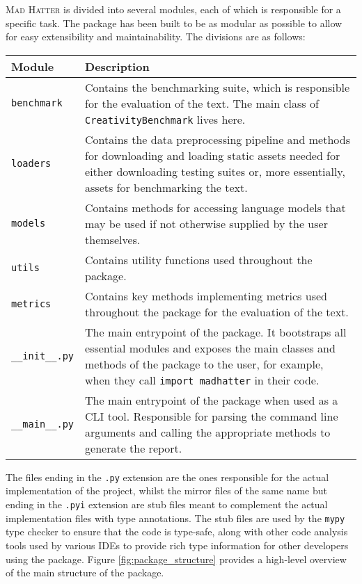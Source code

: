 \textsc{Mad Hatter} is divided into several modules, each of which is responsible for a specific task. The package has been built to be as modular as possible to allow for easy extensibility and maintainability. The divisions are as follows:

\begin{table}[htbp]
    \centering
    \begin{tabular}{p{}p{}}
        \toprule
        \textbf{Module} & \textbf{Description} \\
        \midrule
        \texttt{benchmark} & Contains the benchmarking suite, which is responsible for the evaluation of the text. The main class of \texttt{CreativityBenchmark} lives here. \\
        \texttt{loaders} & Contains the data preprocessing pipeline and methods for downloading and loading static assets needed for either downloading testing suites or, more essentially, assets for benchmarking the text. \\
        \texttt{models} & Contains methods for accessing language models that may be used if not otherwise supplied by the user themselves. \\
        \texttt{utils} & Contains utility functions used throughout the package. \\
        \texttt{metrics} & Contains key methods implementing metrics used throughout the package for the evaluation of the text. \\
        \texttt{\_\_init\_\_.py} & The main entrypoint of the package. It bootstraps all essential modules and exposes the main classes and methods of the package to the user, for example, when they call \texttt{import madhatter} in their code. \\
        \texttt{\_\_main\_\_.py} & The main entrypoint of the package when used as a CLI tool. Responsible for parsing the command line arguments and calling the appropriate methods to generate the report. \\
        \bottomrule
    \end{tabular}
\end{table}


The files ending in the \texttt{.py} extension are the ones responsible for the actual implementation of the project, whilst the mirror files of the same name but ending in the \texttt{.pyi} extension are stub files meant to complement the actual implementation files with type annotations. The stub files are used by the \texttt{mypy} type checker to ensure that the code is type-safe, along with other code analysis tools used by various IDEs to provide rich type information for other developers using the package.
Figure \ref{fig:package_structure} provides a high-level overview of the main structure of the package.


